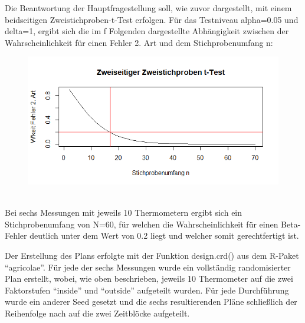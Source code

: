 \documentclass[ ngerman, fontsize= 12pt, paper=a4, headings=big, titlepage=true]{article}
\begin{document}
\noindent Die Beantwortung der Hauptfragestellung soll, wie zuvor dargestellt, mit einem beidseitigen Zweistichproben-t-Test erfolgen. Für das Testniveau alpha=0.05 und delta=1, ergibt sich die im f
Folgenden dargestellte Abhängigkeit zwischen der Wahrscheinlichkeit für einen Fehler 2. Art und dem Stichprobenumfang n: \\
\begin{figure}[h]
\centering
\includegraphics[scale=0.7]{Stichprobenumfang.png}
\end{figure} \\

\noindent Bei sechs Messungen mit jeweils 10 Thermometern ergibt sich ein Stichprobenumfang von N=60, für welchen die Wahrscheinlichkeit für einen Beta-Fehler deutlich unter dem Wert von 0.2 liegt und welcher somit gerechtfertigt ist. 

\noindent Der Erstellung des Plans erfolgte mit der Funktion design.crd() aus dem R-Paket \enquote{agricolae}. Für jede der sechs Messungen wurde ein vollständig randomisierter Plan erstellt, wobei, wie oben beschrieben, jeweils 10 Thermometer auf die zwei Faktorstufen \enquote{inside} und \enquote{outside} aufgeteilt wurden. Für jede Durchführung wurde ein anderer Seed gesetzt und die sechs resultierenden Pläne schließlich der Reihenfolge nach auf die zwei Zeitblöcke aufgeteilt. 
\end{document}
